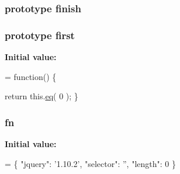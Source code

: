 \subsubsection[{finish}]{ {\bf prototype} finish}\label{jquery-1_810_82-vsdoc_8js_a8a08d47f51f8dd32803538f46edb3e92}
\hypertarget{jquery-1_810_82-vsdoc_8js_a436adcac6bdff190fbce85670078e885}{}
\subsubsection[{first}]{ {\bf prototype} first}\label{jquery-1_810_82-vsdoc_8js_a436adcac6bdff190fbce85670078e885}
{\bfseries Initial value\+:}
\begin{DoxyCode}
= \textcolor{keyword}{function}() \{


        \textcolor{keywordflow}{return} this.\hyperlink{jquery-1_810_82-vsdoc_8js_a57adf3cfa88f689534e187b77491d52d}{eq}( 0 );
    \}
\end{DoxyCode}
\hypertarget{jquery-1_810_82-vsdoc_8js_acef6bdaf6b9b20fdcca1ea86f0902c3b}{}
\subsubsection[{fn}]{ fn}\label{jquery-1_810_82-vsdoc_8js_acef6bdaf6b9b20fdcca1ea86f0902c3b}
{\bfseries Initial value\+:}
\begin{DoxyCode}
= \{ \textcolor{stringliteral}{"jquery"}: \textcolor{stringliteral}{'1.10.2'},
\textcolor{stringliteral}{"selector"}: \textcolor{stringliteral}{''},
\textcolor{stringliteral}{"length"}: 0 \}
\end{DoxyCode}
\hypertarget{jquery-1_810_82-vsdoc_8js_a2bab6fb1fd05f2802566c86887bdc7a2}{}
